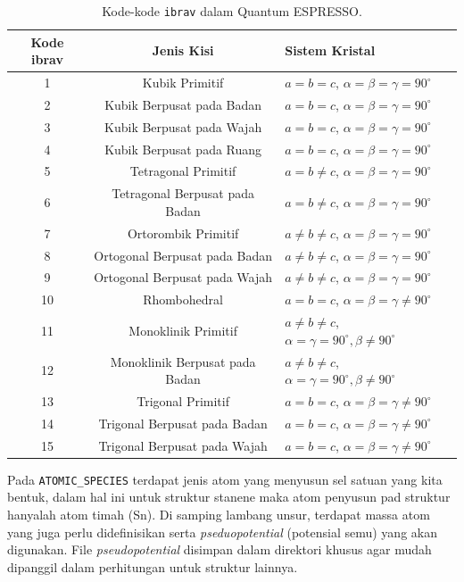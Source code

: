 \begin{table}[ht] %
	\centering
	\caption{Kode-kode \texttt{ibrav} dalam Quantum ESPRESSO.}
	\label{tabel optimasi}
	\label{tab:ibrav}
\begin{tabular}{c c p{4cm} }
\hline
\textbf{Kode ibrav} & \textbf{Jenis Kisi} & \textbf{Sistem Kristal} \\
\hline
 1 & Kubik Primitif & $a=b=c$, $\alpha=\beta=\gamma=90^\circ$ \\
\hline
 2 & Kubik Berpusat pada Badan & $a=b=c$, $\alpha=\beta=\gamma=90^\circ$ \\
\hline
 3 & Kubik Berpusat pada Wajah & $a=b=c$, $\alpha=\beta=\gamma=90^\circ$ \\
\hline
 4 & Kubik Berpusat pada Ruang & $a=b=c$, $\alpha=\beta=\gamma=90^\circ$ \\
\hline
 5 & Tetragonal Primitif & $a=b\neq c$,  $\alpha=\beta=\gamma=90^\circ$ \\
\hline
 6 & Tetragonal Berpusat pada Badan & $a=b\neq c$,  $\alpha=\beta=\gamma=90^\circ$ \\
\hline
 7 & Ortorombik Primitif & $a\neq b\neq c$,  $\alpha=\beta=\gamma=90^\circ$ \\
\hline
 8 & Ortogonal Berpusat pada Badan & $a\neq b\neq c$,  $\alpha=\beta=\gamma=90^\circ$ \\
\hline
 9 & Ortogonal Berpusat pada Wajah & $a\neq b\neq c$, $\alpha=\beta=\gamma=90^\circ$ \\
\hline
 10 & Rhombohedral & $a=b=c$,  $\alpha=\beta=\gamma\neq90^\circ$ \\
\hline
 11 & Monoklinik Primitif & $a\neq b\neq c$,  $\alpha=\gamma=90^\circ, \beta\neq90^\circ$ \\
\hline
 12 & Monoklinik Berpusat pada Badan & $a\neq b\neq c$, $\alpha=\gamma=90^\circ, \beta\neq90^\circ$ \\
\hline
 13 & Trigonal Primitif & $a=b=c$, $\alpha=\beta=\gamma\neq90^\circ$ \\
\hline
 14 & Trigonal Berpusat pada Badan & $a=b=c$, $\alpha=\beta=\gamma\neq90^\circ$ \\
\hline
 15 & Trigonal Berpusat pada Wajah & $a=b=c$, $\alpha=\beta=\gamma\neq90^\circ$ \\
\hline
	\end{tabular}
\end{table}

Pada \texttt{ATOMIC\_SPECIES} terdapat jenis atom yang menyusun sel satuan yang kita bentuk, dalam hal ini untuk struktur stanene maka atom penyusun pad struktur hanyalah atom timah (Sn). Di samping lambang unsur, terdapat massa atom yang juga perlu didefinisikan serta \textit{pseduopotential} (potensial semu) yang akan digunakan. File \textit{pseudopotential} disimpan dalam direktori khusus agar mudah dipanggil dalam perhitungan untuk struktur lainnya.

